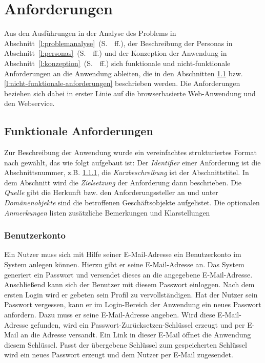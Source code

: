 \section{Anforderungen}\label{l:anforderungen}

Aus den Ausführungen in der Analyse des Problems in Abschnitt~\ref{l:problemanalyse}~(S.~\pageref{l:problemanalyse}~ff.), der Beschreibung der Personas in Abschnitt~\ref{l:personas}~(S.~\pageref{l:personas}~ff.) und der Konzeption der Anwendung in Abschnitt~\ref{l:konzeption}~(S.~\pageref{l:konzeption}~ff.) sich funktionale und nicht-funktionale Anforderungen an die Anwendung ableiten, die in den Abschnitten \ref{l:funktionale-anforderungen} bzw. \ref{l:nicht-funktionale-anforderungen} beschrieben werden. Die Anforderungen beziehen sich dabei in erster Linie auf die browserbasierte Web-Anwendung und den Webservice. 

\subsection{Funktionale Anforderungen}\label{l:funktionale-anforderungen}

Zur Beschreibung der Anwendung wurde ein vereinfachtes strukturiertes Format nach \cite[S.151~ff.]{schienmann2002kontinuierliches} gewählt, das wie folgt aufgebaut ist: Der \emph{Identifier} einer Anforderung ist die Abschnittsnummer, z.B. \ref{anforderung:registrierung},  die \emph{Kurzbeschreibung} ist der Abschnittstitel. In dem Abschnitt wird die \emph{Zielsetzung} der Anforderung dann beschrieben. Die \emph{Quelle} gibt die Herkunft bzw. den Anforderungssteller an und unter \emph{Domänenobjekte} sind die betroffenen Geschäftsobjekte aufgelistet. Die optionalen \emph{Anmerkungen} listen zusätzliche Bemerkungen und Klarstellungen

\subsubsection{Benutzerkonto}\label{anforderung:registrierung}

Ein Nutzer muss sich mit Hilfe seiner E-Mail-Adresse ein Benutzerkonto im System anlegen können. Hierzu gibt er seine E-Mail-Adresse an. Das System generiert ein Passwort und versendet dieses an die angegebene E-Mail-Adresse. Anschließend kann sich der Benutzer mit diesem Passwort einloggen. Nach dem ersten Login wird er gebeten sein Profil zu vervollständigen. Hat der Nutzer sein Passwort vergessen, kann er im Login-Bereich der Anwendung ein neues Passwort anfordern. Dazu muss er seine E-Mail-Adresse angeben. Wird diese E-Mail-Adresse gefunden, wird ein Passwort-Zurücksetzen-Schlüssel erzeugt und per E-Mail an die Adresse versandt. Ein Link in dieser E-Mail öffnet die Anwendung diesem Schlüssel. Passt der übergebene Schlüssel zum gespeicherten Schlüssel wird ein neues Passwort erzeugt und dem Nutzer per E-Mail zugesendet.

